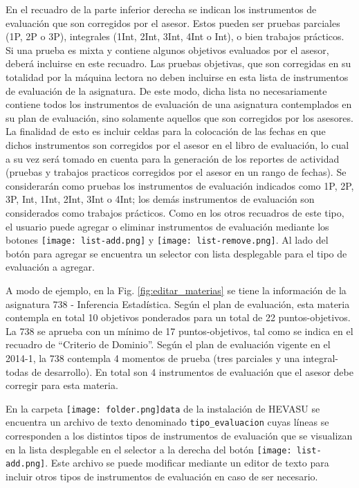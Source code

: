 \documentclass[letterpaper,12pt]{book}
\newcommand{\archivo}[1]
{\texttt{#1}}
\newcommand{\carpeta}[1]
{\texttt{[image: folder.png]}\texttt{#1}}
\begin{document}
En el recuadro de la parte inferior derecha se indican los instrumentos de evaluación que son corregidos por el asesor. Estos pueden ser pruebas parciales (1P, 2P o 3P), integrales (1Int, 2Int, 3Int, 4Int o Int), o bien trabajos prácticos.  Si una prueba es mixta y contiene algunos objetivos evaluados por el asesor, deberá incluirse en este recuadro. Las pruebas objetivas, que son corregidas en su totalidad por la máquina lectora no deben incluirse en esta lista de instrumentos de evaluación de la asignatura.  De este modo, dicha lista no necesariamente contiene todos los instrumentos de evaluación de una asignatura contemplados en su plan de evaluación, sino solamente aquellos que son corregidos por los asesores.  La finalidad de esto es incluir celdas para la colocación de las fechas en que dichos instrumentos son corregidos por el asesor en el libro de evaluación, lo cual a su vez será tomado en cuenta para la generación de los reportes de actividad (pruebas y trabajos practicos corregidos por el asesor en un rango de fechas).  Se considerarán como pruebas los instrumentos de evaluación indicados como 1P, 2P, 3P, Int, 1Int, 2Int, 3Int o 4Int; los demás instrumentos de evaluación son considerados como trabajos prácticos. Como en los otros recuadros de este tipo, el usuario puede agregar o eliminar instrumentos de evaluación mediante los botones \texttt{[image: list-add.png]} y \texttt{[image: list-remove.png]}. Al lado del botón para agregar se encuentra un selector con lista desplegable para el tipo de evaluación a agregar.

A modo de ejemplo, en la Fig. \ref{fig:editar_materias} se tiene la información de la asignatura 738 - Inferencia Estadística. Según el plan de evaluación, esta materia contempla en total 10 objetivos ponderados para un total de 22 puntos-objetivos. La 738 se aprueba con un mínimo de 17 puntos-objetivos, tal como se indica en el recuadro de ``Criterio de Dominio''. Según el plan de evaluación vigente en el 2014-1, la 738 contempla 4 momentos de prueba (tres parciales y una integral- todas de desarrollo). En total son 4 instrumentos de evaluación que el asesor debe corregir para esta materia.

En la carpeta \carpeta{data} de la instalación de HEVASU se encuentra un archivo de texto denominado \archivo{tipo\_evaluacion}\label{sec:editar_materias} cuyas líneas se corresponden a los distintos tipos de instrumentos de evaluación que se visualizan en la lista desplegable en el selector a la derecha del botón \texttt{[image: list-add.png]}. Este archivo se puede modificar mediante un editor de texto para incluir otros tipos de instrumentos de evaluación en caso de ser necesario.
\end{document}
